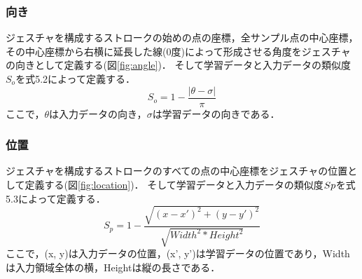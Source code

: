 \subsubsection{向き}
ジェスチャを構成するストロークの始めの点の座標，全サンプル点の中心座標，その中心座標から右横に延長した線(0度)によって形成させる角度をジェスチャの向きとして定義する(図\ref{fig:angle})．
そして学習データと入力データの類似度$S_\textit{o}$を式5.2によって定義する．
\begin{equation}
S_\textit{o} = 1 - \frac{|\theta - \sigma|}{\pi}
\end{equation}
ここで，$\theta$は入力データの向き，$\sigma$は学習データの向きである．


\subsubsection{位置}
ジェスチャを構成するストロークのすべての点の中心座標をジェスチャの位置として定義する(図\ref{fig:location})．
そして学習データと入力データの類似度$S{\scriptsize p}$を式5.3によって定義する．
\begin{equation}
S_\textit{p} = 1 - \frac{\sqrt{(x - x')^2 + (y - y')^2}}{\sqrt{W\!idt\!h^2 * H\!ei\!ght^2}}
\end{equation}
ここで，(x, y)は入力データの位置，(x', y')は学習データの位置であり，Widthは入力領域全体の横，Heightは縦の長さである．

